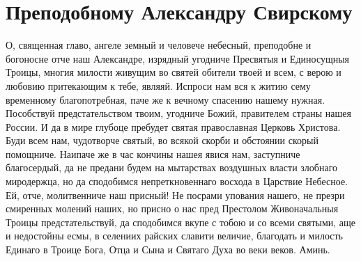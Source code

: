 \mychapterending





\section{Преподобному Александру Свирскому}\begin{mymulticols}




О, священная главо, ангеле земный и человече небесный, преподобне и богоносне отче наш Александре, изрядный угодниче Пресвятыя и Единосущныя Троицы, многия милости живущим во святей обители твоей и всем, с верою и любовию притекающим к тебе, являяй. Испроси нам вся к житию сему временному благопотребная, паче же к вечному спасению нашему нужная. Пособствуй предстательством твоим, угодниче Божий, правителем страны нашея России. И да в мире глубоце пребудет святая православная Церковь Христова. Буди всем нам, чудотворче святый, во всякой скорби и обстоянии скорый помощниче. Наипаче же в час кончины нашея явися нам, заступниче благосердый, да не предани будем на мытарствах воздушных власти злобнаго миродержца, но да сподобимся непреткновеннаго восхода в Царствие Небесное. Ей, отче, молитвенниче наш присный! Не посрами упования нашего, не презри смиренных молений наших, но присно о нас пред Престолом Живоначальныя Троицы предстательствуй, да сподобимся вкупе с тобою и со всеми святыми, аще и недостойны есмы, в селениих райских славити величие, благодать и милость Единаго в Троице Бога, Отца и Сына и Святаго Духа во веки веков. Аминь.


\end{mymulticols}

\mychapterending






